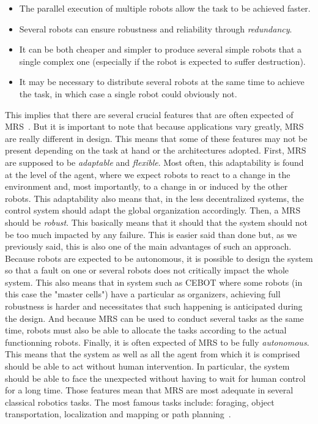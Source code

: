     \begin{itemize}
      \item{The parallel execution of multiple robots allow the task to be achieved faster.}
      \item{Several robots can ensure robustness and reliability through \emph{redundancy}.}
      \item{It can be both cheaper and simpler to produce several simple robots that a single complex one (especially if the robot is expected to suffer destruction).}
      \item{It may be necessary to distribute several robots at the same time to achieve the task, in which case a single robot could obviously not.}
    \end{itemize}

    This implies that there are several crucial features that are often expected of MRS~\cite{Parker1994}. But it is important to note that because applications vary greatly, MRS are really different in design. This means that some of these features may not be present depending on the task at hand or the architectures adopted. First, MRS are supposed to be \emph{adaptable} and \emph{flexible}. Most often, this adaptability is found at the level of the agent, where we expect robots to react to a change in the environment and, most importantly, to a change in or induced by the other robots. This adaptability also means that, in the less decentralized systems, the control system should adapt the global organization accordingly. Then, a MRS should be \emph{robust}. This basically means that it should that the system should not be too much impacted by any failure. This is easier said than done but, as we previously said, this is also one of the main advantages of such an approach. Because robots are expected to be autonomous, it is possible to design the system so that a fault on one or several robots does not critically impact the whole system. This also means that in system such as CEBOT where some robots (in this case the "master cells") have a particular as organizers, achieving full robustness is harder and necessitates that such happening is anticipated during the design. And because MRS can be used to conduct several tasks as the same time, robots must also be able to allocate the tasks according to the actual functionning robots. Finally, it is often expected of MRS to be fully \emph{autonomous}. This means that the system as well as all the agent from which it is comprised should be able to act without human intervention. In particular, the system should be able to face the unexpected without having to wait for human control for a long time. Those features mean that MRS are most adequate in several classical robotics tasks. The most famous tasks include: foraging, object transportation, localization and mapping or path planning~\cite{Farinelli2015}.

